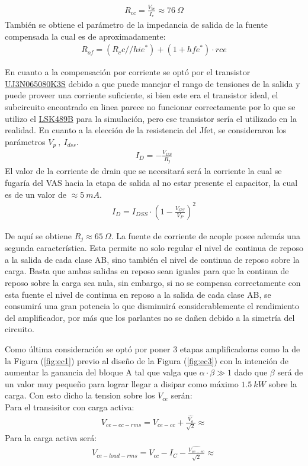 \begin{align}
R_{cc}=\frac{V_{be}}{I_c}\approx 76 \ \Omega
\end{align}
También se obtiene el parámetro de la impedancia de salida de la fuente compensada la cual es de aproximadamente:
\begin{align}
R_{of} = (R_cc // hie^*)+(1+hfe^* )\cdot rce
\end{align}

En cuanto a la compensación por corriente se optó por el transistor \href{https://ar.mouser.com/datasheet/2/827/DS_UJ3N065080K3S-1530401.pdf}{UJ3N065080K3S} debido a que puede manejar el rango de tensiones de la salida y puede proveer una corriente suficiente, si bien este era el transistor ideal, el subcircuito encontrado en linea parece no funcionar correctamente por lo que se utilizo el \href{http://www.linearsystems.com/lsdata/datasheets/LSK489_LOW_NOISE,_LOW_CAPACITANCE_MONOLITHIC_DUAL_N-CHANNEL_JFET.pdf}{LSK489B} para la simulación, pero ese transistor sería el utilizado en la realidad. En cuanto a la  elección de la resistencia del Jfet, se consideraron los parámetros $V_p \ , \ I_{dss}$.
\begin{align}
I_D=-\frac{V_{GS}}{R_j}
\end{align}
El valor de la corriente de drain que se necesitará será la corriente la cual se fugaría del VAS hacia la etapa de salida al no estar presente el capacitor, la cual es de un valor de $\approx 5 \ mA$.
\begin{align}
I_D= I_{DSS} \cdot \left(1-\frac{V_{GS}}{V_P} \right)^2
\end{align}

De aquí se obtiene $R_j \approx 65 \ \Omega$. La fuente de corriente de acople posee además una segunda característica. Esta permite no solo regular el nivel de continua de reposo a la salida de cada clase AB, sino también el nivel de continua de reposo sobre la carga. Basta que ambas salidas en reposo sean iguales para que la continua de reposo sobre la carga sea nula, sin embargo, si no se compensa correctamente con esta fuente el nivel de continua en reposo a la salida de cada clase AB, se consumirá una gran potencia lo que disminuirá considerablemente el rendimiento del amplificador, por más que los parlantes no se dañen debido a la simetría del circuito.

Como última consideración se optó por poner 3 etapas amplificadoras como la de la Figura (\ref{fig:ec1}) previo al diseño de la Figura (\ref{fig:ec3}) con la intención de aumentar la ganancia del bloque A tal  que valga que $\alpha \cdot \beta \gg 1$ dado que $\beta$ será de un valor muy pequeño para lograr llegar a disipar como máximo $1.5 \ kW$ sobre la carga.
Con esto dicho la tension sobre los $V_{ce}$ serán:\\
Para el transisitor con carga activa:
\begin{align}
V_{ce-ec-rms}= V_{ce-cc}+\frac{ \hat{V_o}}{\sqrt{2}}\approx 
\end{align}
Para la carga activa será:
\begin{align}
V_{ce-load-rms}= V_{cc}-I_C-\frac{\hat{V_{ce-ec}}}{\sqrt{2}}\approx
\end{align}


%
